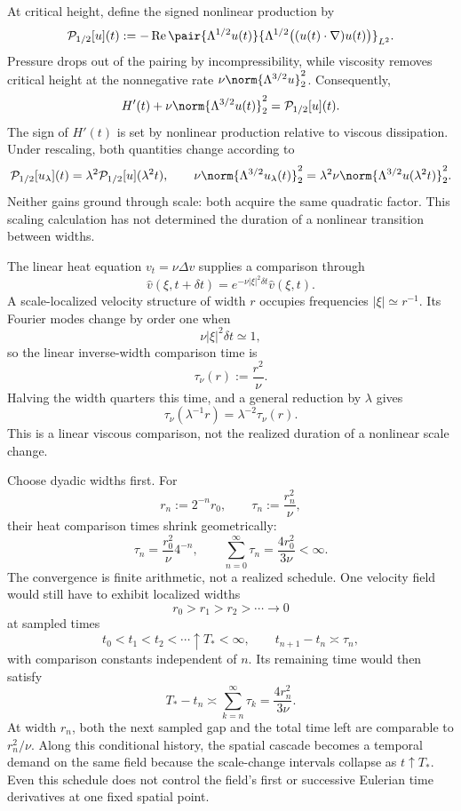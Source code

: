 
At critical height, define the signed nonlinear production by
\[
  \mathcal P_{1/2}[u](t)
  :=
  -\operatorname{Re}
  \pair
    {\Lambda^{1/2}u(t)}
    {\Lambda^{1/2}\bigl((u(t)\cdot\nabla)u(t)\bigr)}_{L^2}.
\]
Pressure drops out of the pairing by incompressibility, while viscosity removes critical height at the nonnegative rate \(\nu\norm{\Lambda^{3/2}u}_2^2\). Consequently,
\[
  H'(t)
  +
  \nu\norm{\Lambda^{3/2}u(t)}_2^2
  =
  \mathcal P_{1/2}[u](t).
\]
The sign of \(H'(t)\) is set by nonlinear production relative to viscous dissipation. Under rescaling, both quantities change according to
\[
  \mathcal P_{1/2}[u_\lambda](t)
  =
  \lambda^2\mathcal P_{1/2}[u](\lambda^2t),
  \qquad
  \nu\norm{\Lambda^{3/2}u_\lambda(t)}_2^2
  =
  \lambda^2\nu\norm{\Lambda^{3/2}u(\lambda^2t)}_2^2.
\]
Neither gains ground through scale: both acquire the same quadratic factor. This scaling calculation has not determined the duration of a nonlinear transition between widths.


The linear heat equation \(v_t=\nu\Delta v\) supplies a comparison through
\[
  \widehat v(\xi,t+\delta t)
  =
  e^{-\nu|\xi|^2\delta t}\widehat v(\xi,t).
\]
A scale-localized velocity structure of width \(r\) occupies frequencies \(|\xi|\simeq r^{-1}\). Its Fourier modes change by order one when
\[
  \nu|\xi|^2\delta t\simeq1,
\]
so the linear inverse-width comparison time is
\[
  \tau_\nu(r)
  :=
  \frac{r^2}{\nu}.
\]
Halving the width quarters this time, and a general reduction by \(\lambda\) gives
\[
  \tau_\nu(\lambda^{-1}r)
  =
  \lambda^{-2}\tau_\nu(r).
\]
This is a linear viscous comparison, not the realized duration of a nonlinear scale change.


Choose dyadic widths first. For
\[
  r_n:=2^{-n}r_0,
  \qquad
  \tau_n:=\frac{r_n^2}{\nu},
\]
their heat comparison times shrink geometrically:
\[
  \tau_n
  =
  \frac{r_0^2}{\nu}4^{-n},
  \qquad
  \sum_{n=0}^{\infty}\tau_n
  =
  \frac{4r_0^2}{3\nu}
  <
  \infty.
\]
The convergence is finite arithmetic, not a realized schedule. One \NavierStokes{} velocity field would still have to exhibit localized widths
\[
  r_0>r_1>r_2>\cdots\longrightarrow0
\]
at sampled times
\[
  t_0<t_1<t_2<\cdots\uparrow T_*<\infty,
  \qquad
  t_{n+1}-t_n\asymp\tau_n,
\]
with comparison constants independent of \(n\). Its remaining time would then satisfy
\[
  T_*-t_n
  \asymp
  \sum_{k=n}^{\infty}\tau_k
  =
  \frac{4r_n^2}{3\nu}.
\]
At width \(r_n\), both the next sampled gap and the total time left are comparable to \(r_n^2/\nu\). Along this conditional history, the spatial cascade becomes a temporal demand on the same field because the scale-change intervals collapse as \(t\uparrow T_*\). Even this schedule does not control the field's first or successive Eulerian time derivatives at one fixed spatial point.
